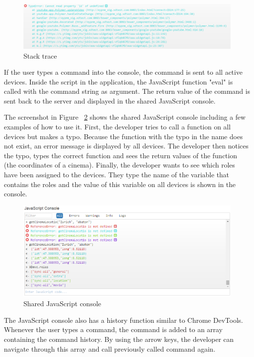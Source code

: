 \begin{figure}[H]
  \centering
    \includegraphics[width=1.0\textwidth]{images/screenshots/stack_trace.png}
	\caption{Stack trace}
	\label{fig:stack_trace}
\end{figure}

If the user types a command into the console, the command is sent to all active devices. Inside the script in the application, the JavaScript function "eval" is called with the command string as argument. The return value of the command is sent back to the server and displayed in the shared JavaScript console.

The screenshot in Figure ~\ref{fig:js_console} shows the shared JavaScript console including a few examples of how to use it. First, the developer tries to call a function on all devices but makes a typo. Because the function with the typo in the name does not exist, an error message is displayed by all devices. The developer then notices the typo, types the correct function and sees the return values of the function (the coordinates of a cinema). Finally, the developer wants to see which roles have been assigned to the devices. They type the name of the variable that contains the roles and the value of this variable on all devices is shown in the console.

\begin{figure}[H]
  \centering
    \includegraphics[width=1.0\textwidth]{images/screenshots/js_console_2.png}
	\caption{Shared JavaScript console}
	\label{fig:js_console}
\end{figure}

The JavaScript console also has a history function similar to Chrome DevTools. Whenever the user types a command, the command is added to an array containing the command history. By using the arrow keys, the developer can navigate through this array and call previously called command again.

